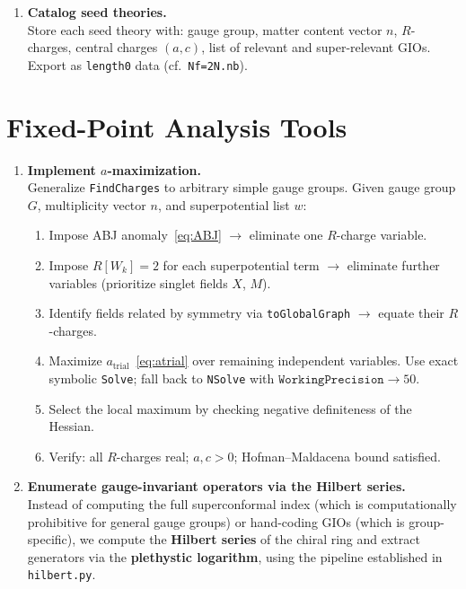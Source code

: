 \documentclass[12pt]{article}
\begin{document}
\begin{enumerate}[label=\textbf{2.\arabic*}]
\item \textbf{Catalog seed theories.} \\
  Store each seed theory with: gauge group, matter content vector $n$, $R$-charges, central charges $(a, c)$,
  list of relevant and super-relevant GIOs. Export as \texttt{length0} data (cf.\ \texttt{Nf=2N.nb}).

\end{enumerate}

\section{Fixed-Point Analysis Tools}

\begin{enumerate}[label=\textbf{3.\arabic*}]

\item \textbf{Implement $a$-maximization.} \\
  Generalize \texttt{FindCharges} to arbitrary simple gauge groups.
  Given gauge group $G$, multiplicity vector $n$, and superpotential list $w$:
  \begin{enumerate}[label=\arabic*.]
    \item Impose ABJ anomaly~\eqref{eq:ABJ} $\to$ eliminate one $R$-charge variable.
    \item Impose $R[W_k] = 2$ for each superpotential term $\to$ eliminate further variables (prioritize singlet fields $X$, $M$).
    \item Identify fields related by symmetry via \texttt{toGlobalGraph} $\to$ equate their $R$-charges.
    \item Maximize $a_{\mathrm{trial}}$~\eqref{eq:atrial} over remaining independent variables.
      Use exact symbolic \texttt{Solve}; fall back to \texttt{NSolve} with $\texttt{WorkingPrecision} \to 50$.
    \item Select the local maximum by checking negative definiteness of the Hessian.
    \item Verify: all $R$-charges real; $a, c > 0$; Hofman--Maldacena bound satisfied.
  \end{enumerate}

\item \textbf{Enumerate gauge-invariant operators via the Hilbert series.} \\
  Instead of computing the full superconformal index (which is computationally prohibitive for
  general gauge groups) or hand-coding GIOs (which is group-specific), we compute the
  \textbf{Hilbert series} of the chiral ring and extract generators via the
  \textbf{plethystic logarithm}, using the pipeline established in \texttt{hilbert.py}.


\end{enumerate}
\end{document}
